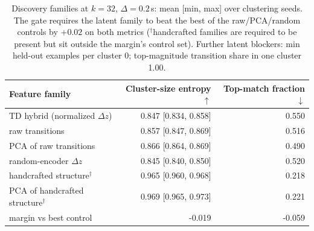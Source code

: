\begin{table}[t]
  \centering
  \small
  \begin{tabular}{lrr}
    \toprule
    Feature family & Cluster-size entropy $\uparrow$ & Top-match fraction $\downarrow$ \\
    \midrule
    TD hybrid (normalized $\Delta z$) & 0.847 [0.834, 0.858] & 0.550 \\
    raw transitions & 0.857 [0.847, 0.869] & 0.516 \\
    PCA of raw transitions & 0.866 [0.864, 0.869] & 0.490 \\
    random-encoder $\Delta z$ & 0.845 [0.840, 0.850] & 0.520 \\
    handcrafted structure$^{\dagger}$ & 0.965 [0.960, 0.968] & 0.218 \\
    PCA of handcrafted structure$^{\dagger}$ & 0.969 [0.965, 0.973] & 0.221 \\
    \midrule
    margin vs best control & -0.019 & -0.059 \\
    \bottomrule
  \end{tabular}
  \caption{Discovery families at $k{=}32$, $\Delta{=}0.2$\,s: mean [min, max] over clustering seeds. The gate requires the latent family to beat the best of the raw/PCA/random controls by $+0.02$ on both metrics ($^{\dagger}$handcrafted families are required to be present but sit outside the margin's control set). Further latent blockers: min held-out examples per cluster 0; top-magnitude transition share in one cluster 1.00.}
  \label{tab:discovery}
\end{table}

